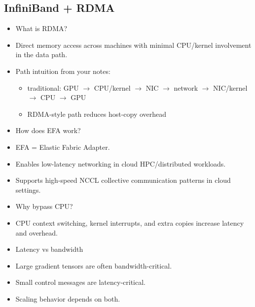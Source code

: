 \documentclass[12pt]{article}
\begin{document}
\subsection{InfiniBand + RDMA}
\begin{itemize}
\item What is RDMA?
\item Direct memory access across machines with minimal CPU/kernel involvement in the data path.
\item Path intuition from your notes:
\begin{itemize}
\item traditional: GPU \(\rightarrow\) CPU/kernel \(\rightarrow\) NIC \(\rightarrow\) network \(\rightarrow\) NIC/kernel \(\rightarrow\) CPU \(\rightarrow\) GPU
\item RDMA-style path reduces host-copy overhead
\end{itemize}
\item How does EFA work?
\item EFA = Elastic Fabric Adapter.
\item Enables low-latency networking in cloud HPC/distributed workloads.
\item Supports high-speed NCCL collective communication patterns in cloud settings.
\item Why bypass CPU?
\item CPU context switching, kernel interrupts, and extra copies increase latency and overhead.
\item Latency vs bandwidth
\item Large gradient tensors are often bandwidth-critical.
\item Small control messages are latency-critical.
\item Scaling behavior depends on both.
\end{itemize}
\end{document}
